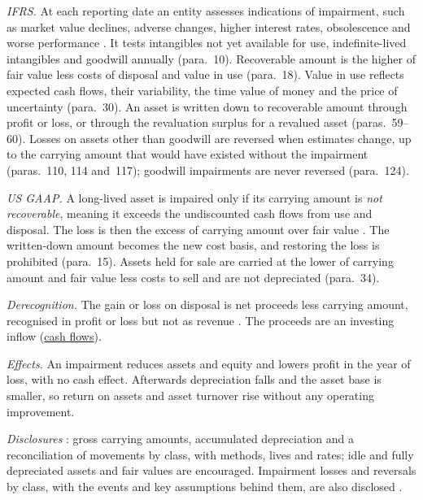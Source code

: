 \begin{qfmethod}\label{meth:impairment-derecognition}
 \emph{IFRS.} At each reporting date an entity assesses indications of impairment, such as market value declines, adverse changes, higher interest rates, obsolescence and worse performance \citep[IAS~36 paras.~9 and~12]{eu-2023-1803-ias36}. It tests intangibles not yet available for use, indefinite-lived intangibles and goodwill annually (para.~10). Recoverable amount is the higher of fair value less costs of disposal and value in use (para.~18). Value in use reflects expected cash flows, their variability, the time value of money and the price of uncertainty (para.~30). An asset is written down to recoverable amount through profit or loss, or through the revaluation surplus for a revalued asset (paras.~59--60). Losses on assets other than goodwill are reversed when estimates change, up to the carrying amount that would have existed without the impairment (paras.~110, 114 and~117); goodwill impairments are never reversed (para.~124).

\emph{US GAAP.} A long-lived asset is impaired only if its carrying amount is \emph{not recoverable}, meaning it exceeds the undiscounted cash flows from use and disposal. The loss is then the excess of carrying amount over fair value \citep[para.~7]{us-impairment-2001}. The written-down amount becomes the new cost basis, and restoring the loss is prohibited (para.~15). Assets held for sale are carried at the lower of carrying amount and fair value less costs to sell and are not depreciated (para.~34).

\emph{Derecognition.} The gain or loss on disposal is net proceeds less carrying amount, recognised in profit or loss but not as revenue \citep[IAS~16 paras.~67--68 and~71]{eu-2023-1803-ias16}. The proceeds are an investing inflow (\hyperref[meth:statement-linked-cash-flows]{cash flows}).

\emph{Effects.} An impairment reduces assets and equity and lowers profit in the year of loss, with no cash effect. Afterwards depreciation falls and the asset base is smaller, so return on assets and asset turnover rise without any operating improvement.

\emph{Disclosures} \citep[IAS~16 paras.~73 and~79]{eu-2023-1803-ias16}: gross carrying amounts, accumulated depreciation and a reconciliation of movements by class, with methods, lives and rates; idle and fully depreciated assets and fair values are encouraged. Impairment losses and reversals by class, with the events and key assumptions behind them, are also disclosed \citep[IAS~36 paras.~126, 130 and~134]{eu-2023-1803-ias36}.


\end{qfmethod}
